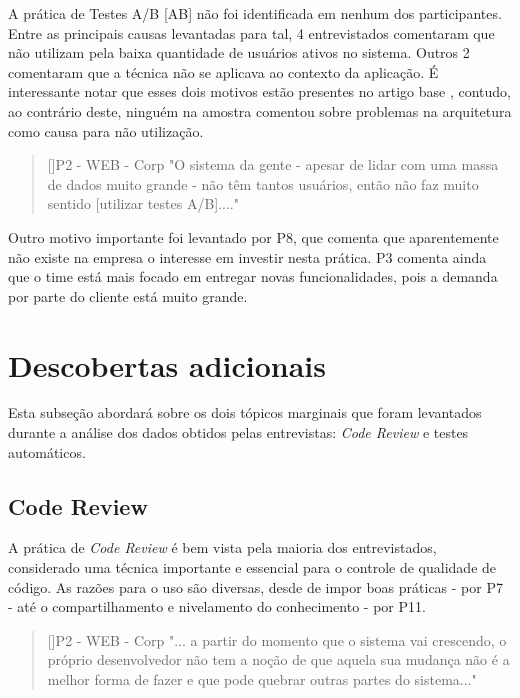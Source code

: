 A prática de Testes A/B [AB] não foi identificada em nenhum dos participantes. Entre as principais causas levantadas para tal, 4 entrevistados comentaram que não utilizam pela baixa quantidade de usuários ativos no sistema. Outros 2 comentaram que a técnica não se aplicava ao contexto da aplicação. É interessante notar que esses dois motivos estão presentes no artigo base \cite{empiricalStudy2016}, contudo, ao contrário deste, ninguém na amostra comentou sobre problemas na arquitetura como causa para não utilização.


\begin{quotation}[]{P2 - WEB - Corp}
    "O sistema da gente - apesar de lidar com uma massa de dados muito grande - não têm tantos usuários, então não faz muito sentido [utilizar testes A/B]...."
\end{quotation}

Outro motivo importante foi levantado por P8, que comenta que aparentemente não existe na empresa o interesse em investir nesta prática. P3 comenta ainda que o time está mais focado em entregar novas funcionalidades, pois a demanda por parte do cliente está muito grande.

\section{Descobertas adicionais}

Esta subseção abordará sobre os dois tópicos marginais que foram levantados durante a análise dos dados obtidos pelas entrevistas: \emph{Code Review} e testes automáticos.

\subsection{Code Review}

A prática de \emph{Code Review} \cite{codeReview} é bem vista pela maioria dos entrevistados, considerado uma técnica importante e essencial para o controle de qualidade de código. As razões para o uso são diversas, desde de impor boas práticas - por P7 - até o compartilhamento e nivelamento do conhecimento - por P11.

\begin{quotation}[]{P2 - WEB - Corp}
    "... a partir do momento que o sistema vai crescendo, o próprio desenvolvedor não tem a noção de que aquela sua mudança não é a melhor forma de fazer e que pode quebrar outras partes do sistema..."
\end{quotation}

